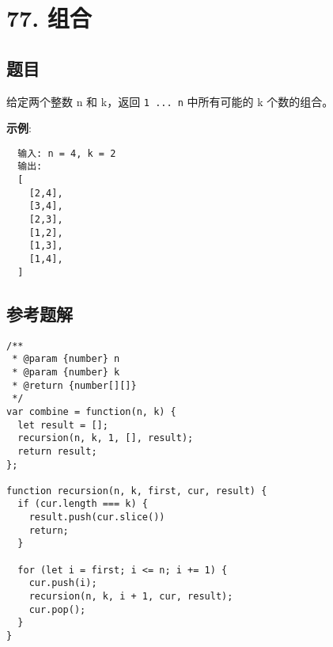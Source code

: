 \newpage
\section{77. 组合}
\label{leetcode:77}

\subsection{题目}

给定两个整数 n 和 k，返回 \verb|1 ... n| 中所有可能的 k 个数的组合。

\textbf{示例}:

\begin{verbatim}
  输入: n = 4, k = 2
  输出:
  [
    [2,4],
    [3,4],
    [2,3],
    [1,2],
    [1,3],
    [1,4],
  ]
\end{verbatim}

\subsection{参考题解}

\begin{verbatim}
/**
 * @param {number} n
 * @param {number} k
 * @return {number[][]}
 */
var combine = function(n, k) {
  let result = [];
  recursion(n, k, 1, [], result);
  return result;
};

function recursion(n, k, first, cur, result) {
  if (cur.length === k) {
    result.push(cur.slice())
    return;
  }

  for (let i = first; i <= n; i += 1) {
    cur.push(i);
    recursion(n, k, i + 1, cur, result);
    cur.pop();
  }
}
\end{verbatim}
